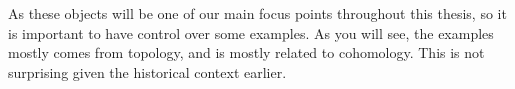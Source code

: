 

As these objects will be one of our main focus points throughout this thesis, so it is important to have control over some examples. As you will see, the examples mostly comes from topology, and is mostly related to cohomology. This is not surprising given the historical context earlier. 



